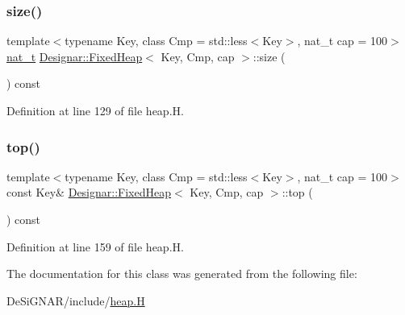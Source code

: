 \subsubsection{\texorpdfstring{size()}{size()}}
{\footnotesize\ttfamily template$<$typename Key, class Cmp = std\+::less$<$\+Key$>$, nat\+\_\+t cap = 100$>$ \\
\hyperlink{namespace_designar_aa72662848b9f4815e7bf31a7cf3e33d1}{nat\+\_\+t} \hyperlink{class_designar_1_1_fixed_heap}{Designar\+::\+Fixed\+Heap}$<$ Key, Cmp, cap $>$\+::size (\begin{DoxyParamCaption}{ }\end{DoxyParamCaption}) const\hspace{0.3cm}{\ttfamily [inline]}}



Definition at line 129 of file heap.\+H.

\mbox{\label{class_designar_1_1_fixed_heap_a2b48592e01a0b8836a18415219a310ca}} 
\subsubsection{\texorpdfstring{top()}{top()}}
{\footnotesize\ttfamily template$<$typename Key, class Cmp = std\+::less$<$\+Key$>$, nat\+\_\+t cap = 100$>$ \\
const Key\& \hyperlink{class_designar_1_1_fixed_heap}{Designar\+::\+Fixed\+Heap}$<$ Key, Cmp, cap $>$\+::top (\begin{DoxyParamCaption}{ }\end{DoxyParamCaption}) const\hspace{0.3cm}{\ttfamily [inline]}}



Definition at line 159 of file heap.\+H.



The documentation for this class was generated from the following file\+:\begin{DoxyCompactItemize}
\item 
De\+Si\+G\+N\+A\+R/include/\hyperlink{heap_8_h}{heap.\+H}\end{DoxyCompactItemize}
